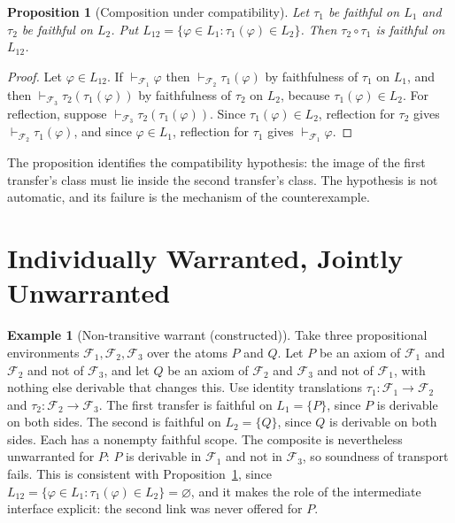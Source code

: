 \documentclass[11pt]{book}
\newtheorem{proposition}[theorem]{Proposition}
\theoremstyle{definition}
\newtheorem{example}[theorem]{Example}
\theoremstyle{remark}
\newcommand{\Fenv}{\mathcal{F}}
\begin{document}
\begin{proposition}[Composition under compatibility]\label{prop:comp}
Let $\tau_1$ be faithful on $L_1$ and $\tau_2$ be faithful on $L_2$. Put $L_{12}=\{\varphi\in L_1:\tau_1(\varphi)\in L_2\}$. Then $\tau_2\circ\tau_1$ is faithful on $L_{12}$.
\end{proposition}

\begin{proof}
Let $\varphi\in L_{12}$. If $\vdash_{\Fenv_1}\varphi$ then $\vdash_{\Fenv_2}\tau_1(\varphi)$ by faithfulness of $\tau_1$ on $L_1$, and then $\vdash_{\Fenv_3}\tau_2(\tau_1(\varphi))$ by faithfulness of $\tau_2$ on $L_2$, because $\tau_1(\varphi)\in L_2$. For reflection, suppose $\vdash_{\Fenv_3}\tau_2(\tau_1(\varphi))$. Since $\tau_1(\varphi)\in L_2$, reflection for $\tau_2$ gives $\vdash_{\Fenv_2}\tau_1(\varphi)$, and since $\varphi\in L_1$, reflection for $\tau_1$ gives $\vdash_{\Fenv_1}\varphi$.
\end{proof}

The proposition identifies the compatibility hypothesis: the image of the first transfer's class must lie inside the second transfer's class. The hypothesis is not automatic, and its failure is the mechanism of the counterexample.

\section{Individually Warranted, Jointly Unwarranted}

\begin{example}[Non-transitive warrant (constructed)]\label{ex:nontrans}
Take three propositional environments $\Fenv_1,\Fenv_2,\Fenv_3$ over the atoms $P$ and $Q$. Let $P$ be an axiom of $\Fenv_1$ and $\Fenv_2$ and not of $\Fenv_3$, and let $Q$ be an axiom of $\Fenv_2$ and $\Fenv_3$ and not of $\Fenv_1$, with nothing else derivable that changes this. Use identity translations $\tau_1\colon\Fenv_1\to\Fenv_2$ and $\tau_2\colon\Fenv_2\to\Fenv_3$. The first transfer is faithful on $L_1=\{P\}$, since $P$ is derivable on both sides. The second is faithful on $L_2=\{Q\}$, since $Q$ is derivable on both sides. Each has a nonempty faithful scope. The composite is nevertheless unwarranted for $P$: $P$ is derivable in $\Fenv_1$ and not in $\Fenv_3$, so soundness of transport fails. This is consistent with Proposition~\ref{prop:comp}, since $L_{12}=\{\varphi\in L_1:\tau_1(\varphi)\in L_2\}=\varnothing$, and it makes the role of the intermediate interface explicit: the second link was never offered for $P$.
\end{example}
\end{document}
